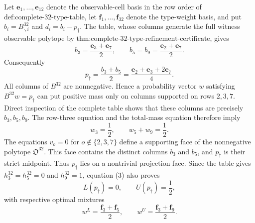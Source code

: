 Let \(\mathbf e_1,\ldots,\mathbf e_{12}\) denote the observable-cell basis in the row order of \(\text{def:complete-32-type-table}\), let \(\mathbf f_1,\ldots,\mathbf f_{32}\) denote the type-weight basis, and put \(b_i=B^{32}_{\cdot,i}\) and \(d_i=b_i-p_\dagger\).  The table, whose columns generate the full witness observable polytope by \(\text{thm:complete-32-type-refinement-certificate}\), gives
\[
b_3=\frac{\mathbf e_3+\mathbf e_7}{2},
\qquad
b_5=b_9=\frac{\mathbf e_2+\mathbf e_7}{2}.
\tag{1}
\]
Consequently
\[
p_\dagger=\frac{b_3+b_5}{2}
=\frac{\mathbf e_2+\mathbf e_3+2\mathbf e_7}{4}.
\tag{2}
\]
All columns of \(B^{32}\) are nonnegative.  Hence a probability vector \(w\) satisfying \(B^{32}w=p_\dagger\) can put positive mass only on columns supported on rows \(2,3,7\).  Direct inspection of the complete table shows that these columns are precisely \(b_3,b_5,b_9\).  The row-three equation and the total-mass equation therefore imply
\[
w_3=\frac12,
\qquad
w_5+w_9=\frac12.
\tag{3}
\]
The equations \(v_o=0\) for \(o\notin\{2,3,7\}\) define a supporting face of the nonnegative polytope \(\mathfrak O^{32}\).  This face contains the distinct columns \(b_3\) and \(b_5\), and \(p_\dagger\) is their strict midpoint.  Thus \(p_\dagger\) lies on a nontrivial projection face.  Since the table gives \(h^{32}_3=h^{32}_5=0\) and \(h^{32}_9=1\), equation (3) also proves
\[
L(p_\dagger)=0,
\qquad
U(p_\dagger)=\frac12,
\tag{4}
\]
with respective optimal mixtures
\[
w^L=\frac{\mathbf f_3+\mathbf f_5}{2},
\qquad
w^U=\frac{\mathbf f_3+\mathbf f_9}{2}.
\tag{5}
\]

